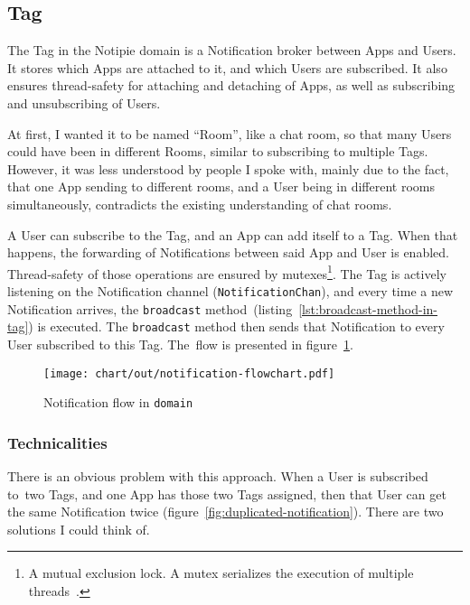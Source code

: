 \subsection{Tag}\label{sec:tag}

The Tag in the Notipie domain
is a Notification broker
between Apps and Users.
It stores which Apps are attached to it,
and which Users are subscribed.
It also ensures thread-safety
for attaching and detaching of Apps,
as well as subscribing and unsubscribing of Users.

At first,
I wanted it to be named ``Room'',
like a chat room,
so that many Users could have been
in different Rooms,
similar to subscribing to multiple Tags.
However,
it was less understood by people I spoke with,
mainly due to the fact,
that one App sending to different rooms,
and a User being in different rooms simultaneously,
contradicts the existing understanding of chat rooms.

A User can subscribe to the Tag,
and an App can add itself to a Tag.
When that happens,
the forwarding of Notifications
between said App and User is enabled.
Thread-safety of those operations
are ensured by mutexes\footnote{
  A mutual exclusion lock.
  A mutex serializes the execution
  of multiple threads~\cite{mattson_patterns_2004}.
}.
The Tag is actively listening
on the Notification channel (\texttt{NotificationChan}),
and every time a new Notification arrives,
the \texttt{broadcast} method~(listing~\ref{lst:broadcast-method-in-tag})
is executed.
The \texttt{broadcast} method then sends that Notification
to every User subscribed to this Tag.
The~flow is presented in figure~\ref{fig:notification-flowchart}.

\begin{figure}[h]
  \centering
  \texttt{[image: chart/out/notification-flowchart.pdf]}
  \caption{Notification flow in \texttt{domain}}
  \label{fig:notification-flowchart}
\end{figure}

\subsubsection{Technicalities}\label{sec:tag-technicalities}

There is an obvious problem with this approach.
When a User is subscribed to~two Tags,
and one App has those two Tags assigned,
then that User can get the same Notification twice
(figure~\ref{fig:duplicated-notification}).
There are two solutions I could think of.

